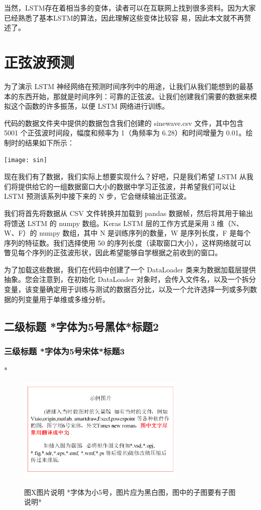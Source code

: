 \documentclass[10.5pt,compsoc]{CjC}
\theoremstyle{mystyle}
\begin{document}
当然，LSTM存在着相当多的变体，读者可以在互联网上找到很多资料。因为大家已经熟悉了基本LSTM的算法，因此理解这些变体比较容 易，因此本文就不再赘述了。\\

\section{正弦波预测}
为了演示 LSTM 神经网络在预测时间序列中的用途，让我们从我们能想到的最基本的东西开始，那就是时间序列：可靠的正弦波。让我们创建我们需要的数据来模拟这个函数的许多振荡，以便 LSTM 网络进行训练。

代码的数据文件夹中提供的数据包含我们创建的 sinewave.csv 文件，其中包含 5001 个正弦波时间段，幅度和频率为 1（角频率为 6.28）和时间增量为 0.01。绘制时的结果如下所示：

\texttt{[image: sin]}

现在我们有了数据，我们实际上想要实现什么？好吧，只是我们希望 LSTM 从我们将提供给它的一组数据窗口大小的数据中学习正弦波，并希望我们可以让 LSTM 预测该系列中接下来的 N 步，它会继续输出正弦波。

我们将首先将数据从 CSV 文件转换并加载到 pandas 数据帧，然后将其用于输出将馈送 LSTM 的 numpy 数组。Keras LSTM 层的工作方式是采用 3 维（N、W、F）的 numpy 数组，其中 N 是训练序列的数量，W 是序列长度，F 是每个序列的特征数。我们选择使用 50 的序列长度（读取窗口大小），这样网络就可以瞥见每个序列的正弦波形状，因此希望能够自学根据之前收到的窗口。

为了加载这些数据，我们在代码中创建了一个 DataLoader 类来为数据加载层提供抽象。您会注意到，在初始化 DataLoader 对象时，会传入文件名，以及一个拆分变量，该变量确定用于训练与测试的数据百分比，以及一个允许选择一列或多列数据的列变量用于单维或多维分析。

{\heiti \subsection{二级标题 *字体为5号黑体*标题2} }
\subsubsection{三级标题 *字体为5号宋体*标题3}
*
\begin{figure}[htbp]
\centerline{\includegraphics[width=3.15in,height=1.98in]{CJC1.pdf}}
图X\quad  图片说明 *字体为小5号，图片应为黑白图，图中的子图要有子图说明*
\label{fig1}
\end{figure}
\end{document}
